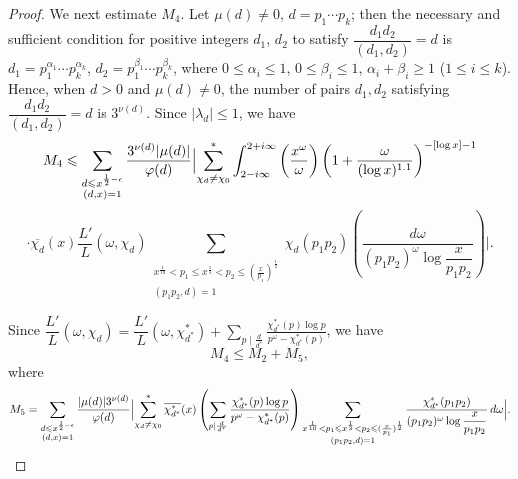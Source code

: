 \begin{proof}
We next estimate $M_4$. Let $\mu(d)\neq0$, $d=p_1\cdots p_k$; then the necessary and sufficient condition for positive integers $d_1$, $d_2$ to satisfy $\dfrac{d_1d_2}{(d_1,d_2)}=d$ is $d_1=p_1^{\alpha_1}\cdots p_k^{\alpha_k}$, $d_2=p_1^{\beta_1}\cdots p_k^{\beta_k}$, where $0\leqslant\alpha_i\leqslant1$, $0\leqslant\beta_i\leqslant1$, $\alpha_i+\beta_i\geqslant1$ ($1\leqslant i\leqslant k$). Hence, when $d>0$ and $\mu(d)\neq0$, the number of pairs $d_1,d_2$ satisfying $\dfrac{d_1d_2}{(d_1,d_2)}=d$ is $3^{\nu(d)}$. Since $|\lambda_d|\leqslant1$, we have
\[
M_4\leqslant\sum_{\substack{d\leqslant x^{\frac12-\epsilon}\\(d,x)=1}}\frac{3^{\nu(d)}|\mu(d)|}{\varphi(d)}
\Bigl|\sum_{\chi_d\neq\chi_0}^{*}\int_{2-i\infty}^{2+i\infty}\left(\frac{x^\omega}{\omega}\right)\left(1+\frac{\omega}{(\log x)^{1.1}}\right)^{-[\log x]-1}
\]
\[
\cdot\overline{\chi_d}(x)\frac{L'}{L}(\omega,\chi_d)
\sum_{\substack{x^{\frac1{10}}<p_1\leqslant x^{\frac13}<p_2\leqslant(\frac{x}{p_1})^{\frac12}\\(p_1p_2,d)=1}}
\chi_d(p_1p_2)\left(\frac{d\omega}{(p_1p_2)^\omega\log\dfrac{x}{p_1p_2}}\right)\Bigr|.
\]

Since $\dfrac{L'}{L}(\omega,\chi_d)=\dfrac{L'}{L}(\omega,\chi_{d^*}^*)+\displaystyle\sum_{p\mid\frac{d}{d^*}}\frac{\chi_{d^*}^*(p)\log p}{p^\omega-\chi_{d^*}^*(p)}$, we have
\begin{equation}\label{eq:chen9en}
M_4\leqslant M_2+M_5,
\end{equation}
where
\[
M_5=\sum_{\substack{d\leqslant x^{\frac12-\epsilon}\\(d,x)=1}}\frac{|\mu(d)|3^{\nu(d)}}{\varphi(d)}
\Bigl|\sum_{\chi_d\neq\chi_0}^{*}\overline{\chi_{d^*}^*}(x)
\left(\sum_{p\mid\frac{d}{d^*}}\frac{\chi_{d^*}^*(p)\log p}{p^\omega-\chi_{d^*}^*(p)}\right)
\sum_{\substack{x^{\frac1{10}}<p_1\leqslant x^{\frac13}<p_2\leqslant(\frac{x}{p_1})^{\frac12}\\(p_1p_2,d)=1}}
\frac{\chi_{d^*}^*(p_1p_2)}{(p_1p_2)^\omega\log\dfrac{x}{p_1p_2}}\,d\omega\Bigr|.
\]


\end{proof}
